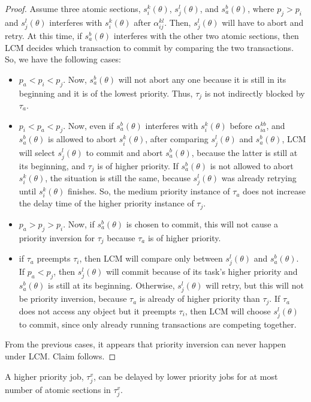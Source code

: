 \begin{proof}
Assume three atomic sections, $s_i^k(\theta)$, $s_j^l(\theta)$, and $s_a^b(\theta)$, where $p_j > p_i$ and $s_j^l(\theta)$ interferes with $s_i^k(\theta)$ after $\alpha_{ij}^{kl}$. Then, $s_j^l(\theta)$ will have to abort and retry. At this time, if $s_a^b(\theta)$ interferes with the other two atomic sections, then LCM decides which transaction to commit by comparing the two transactions. So, we have the following cases:
\begin{itemize}
\item $p_a < p_i < p_j$. Now, $s_a^b(\theta)$ will not abort any one because it is still in its beginning and it is of the lowest priority. Thus, $\tau_j$ is not indirectly blocked by $\tau_a$.
\item $p_i<p_a<p_j$. Now, even if $s_a^b(\theta)$ interferes with $s_i^k(\theta)$ before $\alpha_{ia}^{kb}$,  and $s_a^b(\theta)$ is allowed to abort $s_i^k(\theta)$, after comparing $s_j^l(\theta)$ and $s_a^b(\theta)$, LCM will select $s_j^l(\theta)$ to commit and abort $s_a^b(\theta)$, because the latter is still at its beginning, and $\tau_j$ is of higher priority. If $s_a^b(\theta)$ is not allowed to abort $s_i^k(\theta)$, the situation is still the same, because $s_j^l(\theta)$ was already retrying until $s_i^k(\theta)$ finishes. So, the medium priority instance of $\tau_a$ does not increase the delay time of the higher priority instance of $\tau_j$.
%
\item $p_a>p_j>p_i$. Now, if $s_a^b(\theta)$ is chosen to commit, this will not cause a priority inversion for $\tau_j$ because $\tau_a$ is of higher priority.
\item if $\tau_a$ preempts $\tau_i$, then LCM will compare only between $s_j^l(\theta)$ and $s_a^b(\theta)$. If $p_a<p_j$, then $s_j^l(\theta)$ will commit because of its task's higher priority and $s_a^b(\theta)$ is still at its beginning. Otherwise, $s_j^l(\theta)$ will retry, but this will not be priority inversion, because $\tau_a$ is already of higher priority than $\tau_j$. If $\tau_a$ does not access any object but it preempts $\tau_i$, then LCM will choose $s_j^l(\theta)$ to commit, since only already running transactions are competing together.
\end{itemize}
%
From the previous cases, it appears that priority inversion can never happen under LCM. Claim follows.
\end{proof}

\begin{clm}
\label{priority_inversion}
A higher priority job, $\tau_j^v$, can be delayed by lower priority jobs for at most number of atomic sections in $\tau_j^v$.
\end{clm}

